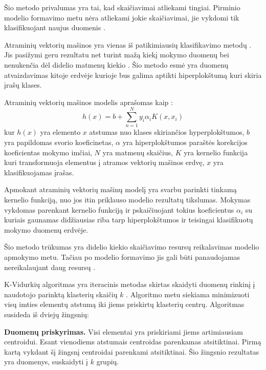 Šio metodo privalumas yra tai,  kad skaičiavimai atliekami tingiai. Pirminio modelio formavimo metu nėra atliekami jokie skaičiavimai, jie vykdomi tik klasifikuojant naujus duomenis \cite{Wu2008}.


Atraminių vektorių mašinos yra vienas iš patikimiausių klasifikavimo metodų \cite{Wu2008}. Jis pasižymi geru rezultatu net turint mažą kiekį mokymo duomenų bei nenukenčia dėl didelio matmenų kiekio \cite{Wu2008}. Šio metodo esmė yra duomenų atvaizdavimas kitoje erdvėje kurioje bus galima aptikti hiperplokštumą kuri skiria įrašų klases.

Atraminių vektorių mašinos modelis aprašomas kaip \cite{comp}:
\begin{equation}
    h(x) = b + \sum_{n=1}^{N}y_i \alpha_i K(x, x_i)
\end{equation}
kur $h(x)$ yra elemento $x$ atstumas nuo klases skiriančios hyperplokštumos, $b$ yra papildomas svorio koeficinetas, $\alpha$ yra hiperplokštumos paraštės korekcijos koeficientas mokymo imčiai, $N$ yra matmenų skaičius, $K$ yra kernelio funkcija kuri transformuoja elementus į atramos vektorių mašinos erdvę, $x$ yra klasifikuojamas įrašas.

Apmokant atraminių vektorių mašinų modelį yra svarbu parinkti tinkamą kernelio funkciją, nuo jos itin priklauso modelio rezultatų tikslumas. Mokymas vykdomas parenkant kernelio funkciją ir pskaičiuojant tokius koeficientus $\alpha_i$ su kuriais gaunamas didžiausias riba tarp hiperplokštumos ir teisingai klasifikuotų mokymo duomenų erdvėje.

Šio metodo trūkumas yra didelio kiekio skaičiavimo resursų reikalavimas modelio apmokymo metu. Tačiau po modelio formavimo jis gali būti panaudojamas nereikalaujant daug resursų \cite{Wu2008}.



 K-Vidurkių algoritmas yra iteracinis metodas skirtas skaidyti duomenų rinkinį į naudotojo parinktą klasterių skaičių $k$ \cite{Wu2008}. Algoritmo metu siekiama minimizuoti visų imties elementų atstumą iki jiems priskirtų klasterių centrų. Algoritmas susideda iš dviejų žingsnių:

 \textbf{Duomenų priskyrimas.} Visi elementai yra priskiriami jiems artimiausiam centroidui. Esant vienodiems atstumais centroidas parenkamas atsitiktinai. Pirmą kartą vykdant šį žingsnį centroidai parenkami atsitiktinai. Šio žingsnio rezultatas yra duomenys, suskaidyti į $k$ grupių.

